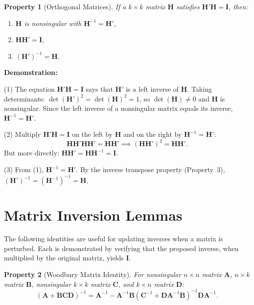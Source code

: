 \documentclass[11pt]{article}
\newtheorem{property}{Property}
\newcommand{\Ainv}{\bm{A}^{-1}}
\newcommand{\A}{\bm{A}}
\newcommand{\B}{\bm{B}}
\newcommand{\I}{\bm{I}}
\begin{document}
\begin{property}[Orthogonal Matrices]
If a $k\times k$ matrix $\bm{H}$ satisfies $\bm{H}'\bm{H} = \I$, then:
\begin{enumerate}
\item $\bm{H}$ is nonsingular with $\bm{H}^{-1} = \bm{H}'$,
\item $\bm{H}\bm{H}' = \I$,
\item $(\bm{H}')^{-1} = \bm{H}$.
\end{enumerate}
\end{property}

\textbf{Demonstration:}

(1) The equation $\bm{H}'\bm{H} = \I$ says that $\bm{H}'$ is a left inverse of $\bm{H}$. Taking determinants: $\det(\bm{H}')^2 = \det(\bm{H})^2 = 1$, so $\det(\bm{H}) \neq 0$ and $\bm{H}$ is nonsingular. Since the left inverse of a nonsingular matrix equals its inverse, $\bm{H}^{-1} = \bm{H}'$.

\medskip

(2) Multiply $\bm{H}'\bm{H} = \I$ on the left by $\bm{H}$ and on the right by $\bm{H}^{-1} = \bm{H}'$:
\[
\bm{H}\bm{H}'\bm{H}\bm{H}' = \bm{H}\bm{H}' \implies (\bm{H}\bm{H}')^2 = \bm{H}\bm{H}'.
\]
But more directly: $\bm{H}\bm{H}' = \bm{H}\bm{H}^{-1} = \I$.

\medskip

(3) From (1), $\bm{H}^{-1} = \bm{H}'$. By the inverse transpose property (Property~3), $(\bm{H}')^{-1} = (\bm{H}^{-1})^{-1} = \bm{H}$.

\section*{Matrix Inversion Lemmas}

The following identities are useful for updating inverses when a matrix is perturbed. Each is demonstrated by verifying that the proposed inverse, when multiplied by the original matrix, yields $\I$.

\begin{property}[Woodbury Matrix Identity]
For nonsingular $n\times n$ matrix $\A$, $n\times k$ matrix $\B$, nonsingular $k\times k$ matrix $\bm{C}$, and $k\times n$ matrix $\bm{D}$:
\[
(\A + \B\bm{C}\bm{D})^{-1} = \Ainv - \Ainv\B(\bm{C}^{-1} + \bm{D}\Ainv\B)^{-1}\bm{D}\Ainv.
\]
\end{property}
\end{document}
